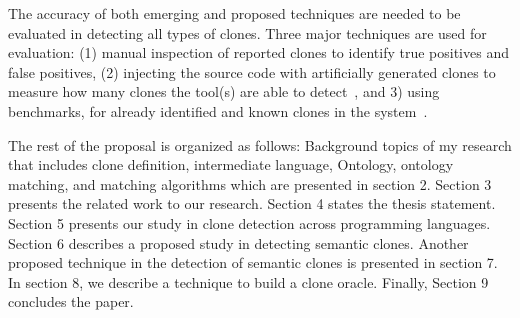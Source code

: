 The accuracy of both emerging and proposed techniques are needed to be evaluated in detecting all types of clones. Three major techniques are used for evaluation: (1) manual inspection of reported clones to identify true positives and false positives, (2) injecting the source code with artificially generated clones to measure how many clones the tool(s) are able to detect~\cite{Svajlenko2014,Roy2009a}, and 3) using benchmarks, for already identified and known clones in the system~\cite{Krutz2014,Bellon2007}.   

The rest of the proposal is organized as follows: Background topics of my research that includes clone definition, intermediate language, Ontology, ontology matching, and matching algorithms which are presented in section 2. Section 3 presents the related work to our research. Section 4 states the thesis statement. Section 5 presents our study in clone detection across programming languages. Section 6 describes a proposed study in detecting semantic clones. Another proposed technique in the detection of semantic clones is presented in section 7. In section 8, we describe a technique to build a clone oracle. Finally, Section 9 concludes the paper. 